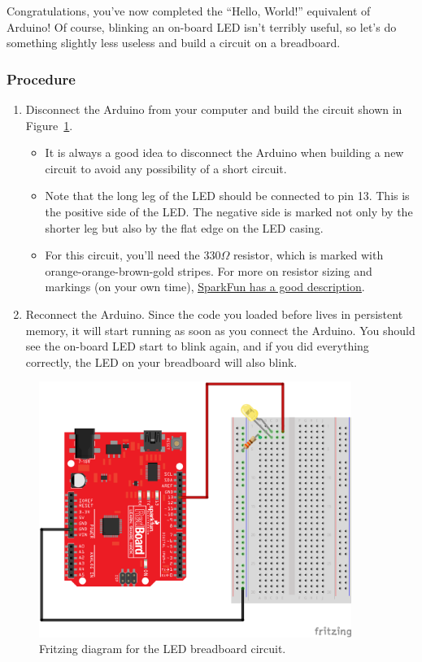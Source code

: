 \documentclass[11pt]{article} %
\begin{document}
Congratulations, you’ve now completed the “Hello, World!” equivalent of Arduino! Of course, blinking an on-board LED isn’t terribly useful, so let’s do something slightly less useless and build a circuit on a breadboard.

\subsubsection*{Procedure}

\begin{enumerate}
\item Disconnect the Arduino from your computer and build the circuit shown in Figure~\ref{fig:led}. 
\begin{itemize}
    \item It is always a good idea to disconnect the Arduino when building a new circuit to avoid any possibility of a short circuit.
    \item Note that the long leg of the LED should be connected to pin 13. This is the positive side of the LED. The negative side is marked not only by the shorter leg but also by the flat edge on the LED casing.
    \item For this circuit, you'll need the 330$\Omega$ resistor, which is marked with orange-orange-brown-gold stripes. For more on resistor sizing and markings (on your own time), \href{https://learn.sparkfun.com/tutorials/resistors/decoding-resistor-markings}{\underline{SparkFun has a good description}}.
\end{itemize}
\item Reconnect the Arduino. Since the code you loaded before lives in persistent memory, it will start running as soon as you connect the Arduino. You should see the on-board LED start to blink again, and if you did everything correctly, the LED on your breadboard will also blink.
\end{enumerate}

\begin{figure}[htbp]
\begin{center}
\includegraphics[width=4in]{figures/led_fritz.png}
\caption{Fritzing diagram for the LED breadboard circuit. }
\label{fig:led}
\end{center}
\end{figure}
\end{document}
